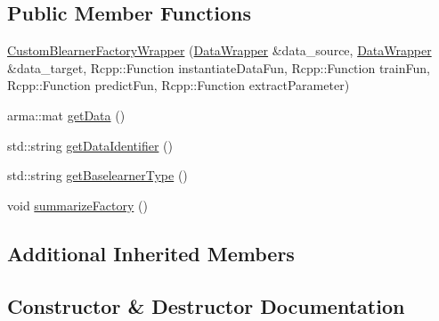\subsection*{Public Member Functions}
\begin{DoxyCompactItemize}
\item 
\mbox{\hyperlink{class_custom_blearner_factory_wrapper_af2a4252cc47bb70c23c71ed3f201e29f}{Custom\+Blearner\+Factory\+Wrapper}} (\mbox{\hyperlink{class_data_wrapper}{Data\+Wrapper}} \&data\+\_\+source, \mbox{\hyperlink{class_data_wrapper}{Data\+Wrapper}} \&data\+\_\+target, Rcpp\+::\+Function instantiate\+Data\+Fun, Rcpp\+::\+Function train\+Fun, Rcpp\+::\+Function predict\+Fun, Rcpp\+::\+Function extract\+Parameter)
\item 
arma\+::mat \mbox{\hyperlink{class_custom_blearner_factory_wrapper_a70a976e3608e37e0740df932b227de60}{get\+Data}} ()
\item 
std\+::string \mbox{\hyperlink{class_custom_blearner_factory_wrapper_a67eba4cecf4cbde07ce5dca73a909f0f}{get\+Data\+Identifier}} ()
\item 
std\+::string \mbox{\hyperlink{class_custom_blearner_factory_wrapper_a3131dcf7abf08a2d8cd1da1472d2a36c}{get\+Baselearner\+Type}} ()
\item 
void \mbox{\hyperlink{class_custom_blearner_factory_wrapper_a5247b68ba5b66b7ad70fc408b0c9da2c}{summarize\+Factory}} ()
\end{DoxyCompactItemize}
\subsection*{Additional Inherited Members}


\subsection{Constructor \& Destructor Documentation}
\mbox{\label{class_custom_blearner_factory_wrapper_af2a4252cc47bb70c23c71ed3f201e29f}} 
